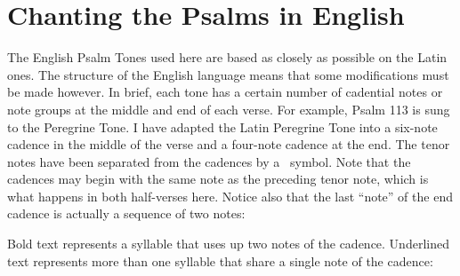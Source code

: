\documentclass[12pt]{article} %
\def\noinitial{%
\gresetfirstlineaboveinitial{\textcolor{benred8}{\small \textsc{\textbf{}}}}{\textcolor{benred8}{\small \textsc{\textbf{}}}}
\setspaceafterinitial{0pt plus 0em minus 0em}%
\setspacebeforeinitial{0pt plus 0em minus 0em}%
\relax %
}
\newenvironment{response}{\leftskip 0in \setlength{\parindent}{0in}}{\vspace{1 mm}}
\def\pipe{\textcolor{benred8}{\textdoublepipe}}
\begin{document}
\gresetfirstlineaboveinitial{\small \textsc{ \textbf{\textcolor{benred8}{VI}}}}{\small \textsc{ \textbf{\textcolor{benred8}{VI}}}}

\vspace{2mm}

\gresetfirstlineaboveinitial{\small \textsc{ \textbf{\textcolor{benred8}{VI}}}}{\small \textsc{ \textbf{\textcolor{benred8}{VI}}}}

\vspace{2mm}

\gresetfirstlineaboveinitial{\small \textsc{ \textbf{\textcolor{benred8}{V}}}}{\small \textsc{ \textbf{\textcolor{benred8}{V}}}}

\vspace{2mm}

\newpage


\section*{Chanting the Psalms in English}

\thispagestyle{plain}

\begin{response}
The English Psalm Tones used here are based as closely as possible on the Latin ones. The structure of the English language means that some modifications must be made however. In brief, each tone has a certain number of cadential notes or note groups at the middle and end of each verse. For example, Psalm 113 is sung to the Peregrine Tone. I have adapted the Latin Peregrine Tone into a six-note cadence in the middle of the verse and a four-note cadence at the end. The tenor notes have been separated from the cadences by a \pipe\ symbol. Note that the cadences may begin with the same note as the preceding tenor note, which is what happens in both half-verses here. Notice also that the last ``note'' of the end cadence is actually a sequence of two notes:

\end{response}

{\noinitial
{}

}

\begin{response}
Bold text represents a syllable that uses up two notes of the cadence. Underlined text represents more than one syllable that share a single note of the cadence:

\end{response}
\end{document}
